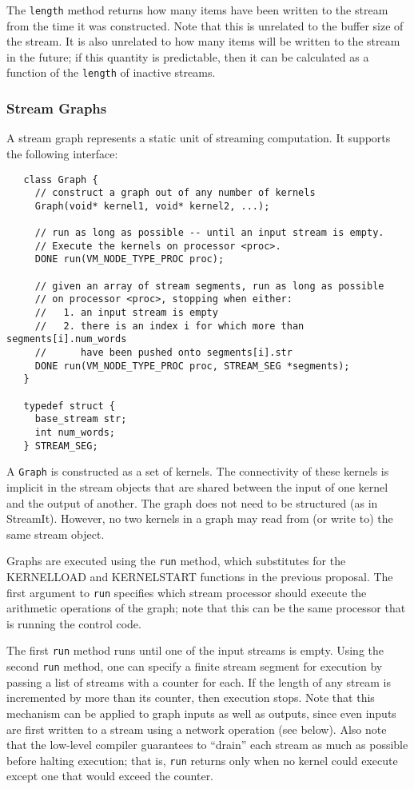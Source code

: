 The {\tt length} method returns how many items have been written to
the stream from the time it was constructed.  Note that this is
unrelated to the buffer size of the stream.  It is also unrelated to
how many items will be written to the stream in the future; if this
quantity is predictable, then it can be calculated as a function of
the {\tt length} of inactive streams.

\subsubsection{Stream Graphs}
\label{sec:streamgraph}

A stream graph represents a static unit of streaming computation.  It
supports the following interface:
\begin{verbatim}
   class Graph {
     // construct a graph out of any number of kernels
     Graph(void* kernel1, void* kernel2, ...);

     // run as long as possible -- until an input stream is empty.  
     // Execute the kernels on processor <proc>.
     DONE run(VM_NODE_TYPE_PROC proc);

     // given an array of stream segments, run as long as possible
     // on processor <proc>, stopping when either:
     //   1. an input stream is empty
     //   2. there is an index i for which more than segments[i].num_words 
     //      have been pushed onto segments[i].str
     DONE run(VM_NODE_TYPE_PROC proc, STREAM_SEG *segments);
   }

   typedef struct {
     base_stream str;
     int num_words;
   } STREAM_SEG;
\end{verbatim}

A {\tt Graph} is constructed as a set of kernels.  The connectivity of
these kernels is implicit in the stream objects that are shared
between the input of one kernel and the output of another.  The graph
does not need to be structured (as in StreamIt).  However, no two
kernels in a graph may read from (or write to) the same stream object.

Graphs are executed using the {\tt run} method, which substitutes for
the KERNELLOAD and KERNELSTART functions in the previous proposal.
The first argument to {\tt run} specifies which stream processor
should execute the arithmetic operations of the graph; note that this
can be the same processor that is running the control code.

The first {\tt run} method runs until one of the input streams is
empty.  Using the second {\tt run} method, one can specify a finite
stream segment for execution by passing a list of streams with a
counter for each.  If the length of any stream is incremented by more
than its counter, then execution stops.  Note that this mechanism can
be applied to graph inputs as well as outputs, since even inputs are
first written to a stream using a network operation (see below).  Also
note that the low-level compiler guarantees to ``drain'' each stream
as much as possible before halting execution; that is, {\tt run}
returns only when no kernel could execute except one that would exceed
the counter.

